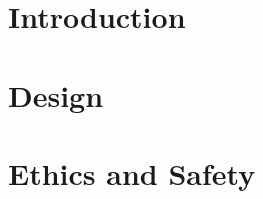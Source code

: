 \documentclass[12pt]{article}
\begin{document}

\clearpage
\section{Introduction}
\section{Design}
\section{Ethics and Safety}

\clearpage
\end{document}
